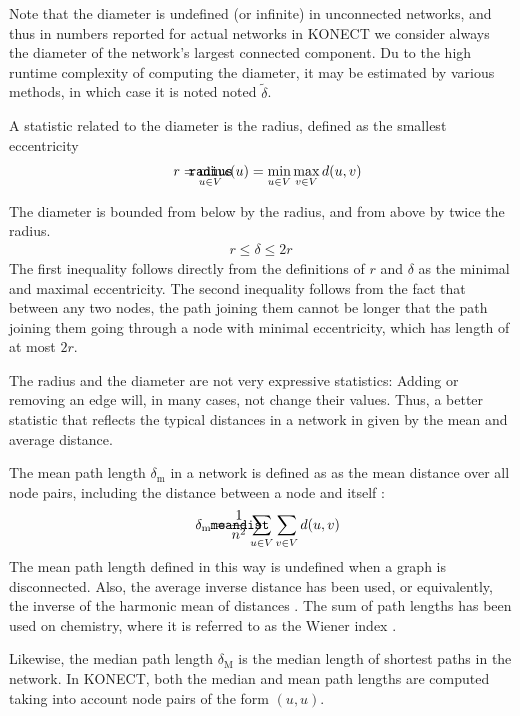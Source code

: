 \documentclass{article}
\def\mathnote#1{%
  \tag*{\rlap{\hspace\marginparsep\smash{\parbox[t]{\marginparwidth}{#1}}}}
}
\begin{document}
Note that the diameter is undefined (or infinite) in unconnected
networks, and thus in numbers reported for actual networks in KONECT we
consider always the diameter of the network's largest connected
component.  Du to the high runtime complexity of computing the diameter,
it may be estimated by various methods, in which case it is noted noted
$\tilde \delta$.

A statistic related to the diameter is the radius, defined as the
smallest eccentricity
\begin{align}
  \mathnote{\texttt{radius}} r &= \min_{u \in V} \epsilon(u) = \min_{u
    \in V} \max_{v \in V} d(u,v)
\end{align}

The diameter is bounded from below by the radius, and from above by
twice the radius.  
\begin{align}
  r \leq \delta \leq 2r
\end{align}
The first inequality follows directly from the definitions of $r$ and
$\delta$ as the minimal and maximal eccentricity.  The second inequality
follows from the fact that between any two nodes, the path joining them
cannot be longer that the path joining them going through a node with
minimal eccentricity, which has length of at most $2r$. 

The radius and the diameter are not very expressive statistics: Adding
or removing an edge will, in many cases, not change their values.  Thus,
a better statistic that reflects the typical distances in a network in
given by the mean and average distance.

The mean path length $\delta_{\mathrm m}$ in a network is defined as as
the mean distance over all node pairs, including the distance between a
node and itself \citep{b779}:
\begin{align}
  \mathnote{\texttt{meandist}} 
  \delta_{\mathrm m} &= \frac 1 {n^2}
  \sum_{u \in V} \sum_{v\in V} d(u,v)
\end{align}
The mean path length defined in this way is undefined when a graph is
disconnected.  Also, the average inverse distance has been used, or
equivalently, the inverse of the harmonic mean of distances
\citep{b877}.  The sum of path lengths has been used on chemistry, where
it is referred to as the Wiener index \citep{b901}.

Likewise, the median path length $\delta_{\mathrm M}$ is the median
length of shortest paths in the network.  In KONECT, both the median and
mean path lengths are computed taking into account node pairs of the
form $(u,u)$.
\end{document}
